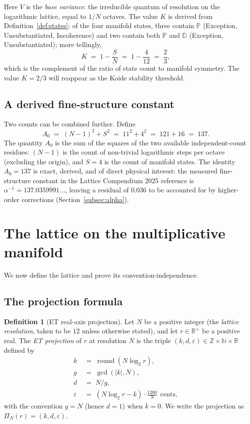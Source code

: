 \documentclass[11pt,a4paper]{article}
\theoremstyle{definition}
\newtheorem{definition}[theorem]{Definition}
\theoremstyle{remark}
\newcommand{\R}{\mathbb{R}}
\newcommand{\Z}{\mathbb{Z}}
\newcommand{\N}{\mathbb{N}}
\newcommand{\PP}{\mathbb{P}}
\newcommand{\DD}{\mathbb{D}}
\DeclareMathOperator{\round}{round}
\newcommand{\eps}{\varepsilon}
\begin{document}
Here $V$ is the \emph{base variance}: the irreducible quantum of resolution on the logarithmic lattice, equal to $1/N$ octaves. The value $K$ is derived from Definition~\ref{def:states}: of the four manifold states, three contain $\PP$ (Exception, Unsubstantiated, Incoherence) and two contain both $\PP$ and $\DD$ (Exception, Unsubstantiated); more tellingly,
\[
K \;=\; 1 - \frac{S}{N} \;=\; 1 - \frac{4}{12} \;=\; \frac{2}{3},
\]
which is the complement of the ratio of state count to manifold symmetry. The value $K=2/3$ will reappear as the Koide stability threshold.

\subsection{A derived fine-structure constant}

Two counts can be combined further. Define
\begin{equation}\label{eq:A0}
A_{0} \;=\; (N-1)^{2} + S^{2} \;=\; 11^{2} + 4^{2} \;=\; 121 + 16 \;=\; 137.
\end{equation}
The quantity $A_{0}$ is the sum of the squares of the two available independent-count residues: $(N-1)$ is the count of non-trivial logarithmic steps per octave (excluding the origin), and $S=4$ is the count of manifold states. The identity $A_{0}=137$ is exact, derived, and of direct physical interest: the measured fine-structure constant in the Lattice Compendium 2025 reference is $\alpha^{-1}=137.0359991...$, leaving a residual of $0.036$ to be accounted for by higher-order corrections (Section~\ref{subsec:alpha}).

\section{The lattice on the multiplicative manifold}\label{sec:lattice}

We now define the lattice and prove its convention-independence.

\subsection{The projection formula}

\begin{definition}[ET real-axis projection]\label{def:projection}
Let $N$ be a positive integer (the \emph{lattice resolution}, taken to be $12$ unless otherwise stated), and let $r\in\R^{+}$ be a positive real. The \emph{ET projection} of $r$ at resolution $N$ is the triple $(k,d,\eps)\in\Z\times\N\times\R$ defined by
\begin{align}
k &\;=\; \round(N\log_{2}r),\label{eq:k}\\
g &\;=\; \gcd(|k|,N),\\
d &\;=\; N/g,\label{eq:d}\\
\eps &\;=\; (N\log_{2}r - k)\cdot\frac{1200}{N}\ \ \text{cents},\label{eq:eps}
\end{align}
with the convention $g=N$ (hence $d=1$) when $k=0$. We write the projection as $\Pi_{N}(r) = (k,d,\eps)$.
\end{definition}
\end{document}
